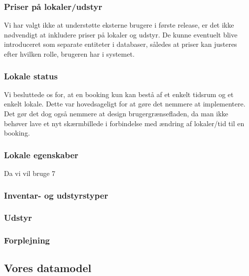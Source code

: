 \subsubsection{Priser på lokaler/udstyr}
\label{Technical_Database_ks_prices}
Vi har valgt ikke at understøtte eksterne brugere i første release, er det ikke nødvendigt at inkludere priser på lokaler og udstyr. De kunne eventuelt blive introduceret som separate entiteter i databaser, således at priser kan justeres efter hvilken rolle, brugeren har i systemet.

\subsubsection{Lokale status}
\label{Technical_Database_ks_roomStatus}
Vi besluttede os for, at en booking kun kan bestå af et enkelt tidsrum og et enkelt lokale. Dette var hovedsageligt for at gøre det nemmere at implementere. Det gør det dog også nemmere at design brugergrænsefladen, da man ikke behøver lave et nyt skærmbillede i forbindelse med ændring af lokaler/tid til en booking.

\subsubsection{Lokale egenskaber}
\label{Technica l_Database_ks_roomProperties}
Da vi vil bruge 7

\subsubsection{Inventar- og udstyrstyper}
\label{Technical_Database_ks_types}

\subsubsection{Udstyr}
\label{Technical_Database_ks_eChoice}

\subsubsection{Forplejning}
\label{Technical_Database_ks_catering}

\subsection{Vores datamodel}
\label{Technical_Database_our}


